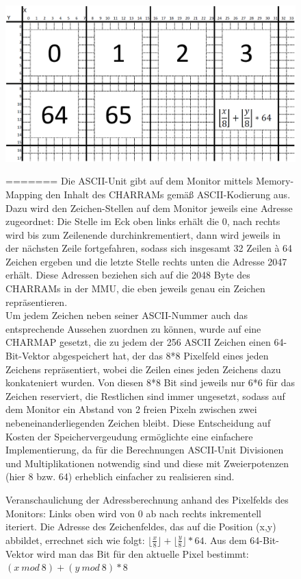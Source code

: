 \begin{figure}[H]
	\centering
		\includegraphics[width=1.0\textwidth]{Bildschirm.png}
	\caption[Veranschaulichung der Adressberechnung der ASCII-Unit]{Veranschaulichung der Adressberechnung anhand des Pixelfelds des Monitors: Links oben wird von 0 ab nach rechts inkrementell iteriert. Die Adresse des Zeichenfeldes, das auf die Position (x,y) abbildet, errechnet sich wie folgt: $\lfloor \frac{x}{8} \rfloor + \lfloor \frac{y}{8} \rfloor * 64$. Aus dem 64-Bit-Vektor wird man das Bit f\"ur den aktuelle Pixel bestimmt: $(x\:  mod\:  8) + (y\:  mod\:  8) * 8$}
=======
Die ASCII-Unit gibt auf dem Monitor mittels Memory-Mapping den Inhalt des CHARRAMs gem{\"a}{\ss} ASCII-Kodierung aus. Dazu wird den Zeichen-Stellen auf dem Monitor jeweils eine Adresse zugeordnet: Die Stelle im Eck oben links erh\"alt die 0, nach rechts wird bis zum Zeilenende durchinkrementiert, dann wird jeweils in der n\"achsten Zeile fortgefahren, sodass sich insgesamt 32 Zeilen \`a 64 Zeichen ergeben und die letzte Stelle rechts unten die Adresse 2047 erh\"alt. Diese Adressen beziehen sich auf die 2048 Byte des CHARRAMs in der MMU, die eben jeweils genau ein Zeichen repr\"asentieren.\\
Um jedem Zeichen neben seiner ASCII-Nummer auch das entsprechende Aussehen zuordnen zu k\"onnen, wurde auf eine CHARMAP gesetzt, die zu jedem der 256 ASCII Zeichen einen 64-Bit-Vektor abgespeichert hat, der das 8*8 Pixelfeld eines jeden Zeichens repr\"asentiert, wobei die Zeilen eines jeden Zeichens dazu konkateniert wurden. Von diesen 8*8 Bit sind jeweils nur 6*6 f\"ur das Zeichen reserviert, die Restlichen sind immer ungesetzt, sodass auf dem Monitor ein Abstand von 2 freien Pixeln zwischen zwei nebeneinanderliegenden Zeichen bleibt. Diese Entscheidung auf Kosten der Speichervergeudung erm\"oglichte eine einfachere Implementierung, da f\"ur die Berechnungen ASCII-Unit Divisionen und Multiplikationen notwendig sind und diese mit Zweierpotenzen (hier 8 bzw. 64) erheblich einfacher zu realisieren sind.


\end{figure}
